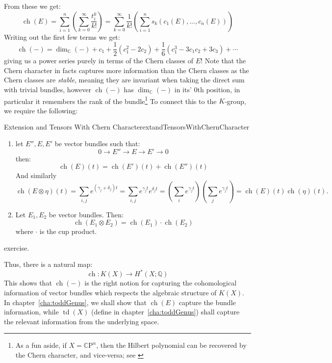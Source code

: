 \documentclass{book}
\newcommand{\C}{{\mathbb{C}}}
\newcommand{\Q}{{\mathbb{Q}}}
\newcommand{\CP}{\mathbb{C}\mathrm{P}}
\newcommand{\ch}{{\operatorname{ch}}}
\newcommand{\td}{{\operatorname{td}}}
\begin{document}
From these we get:
\[
\ch(E) = \sum_{i=1}^n \left(\sum_{k=0}^{\infty} \frac{t_i^k}{k!}\right) = \sum_{k=0}^{\infty}
\frac{1}{k!}\left(\sum_{i=1}^n s_k(c_1(E), ..., c_n(E))\right)
\]
Writing out the first few terms we get:
\[
  \ch(-) = \dim_\C(-) + c_1 + \frac{1}{2}(c_1^2 - 2c_2) + \frac{1}{6}(c_1^3 - 3c_1c_2 + 3c_3) + \cdots
\]
giving us a power series purely in terms of the Chern classes of $E$! Note that the Chern character in facts
captures more information than the Chern classes as the Chern classes are \emph{stable}, meaning they are
invariant when taking the direct sum with trivial bundles, however $\ch(-)$ has $\dim_\C(-)$ in its' $0$th
position, in particular it remembers the rank of the bundle\footnote{As a fun aside, if $X = \CP^n$, then the
Hilbert polynomial can be recovered by the Chern character, and vice-versa; see \cite{chanCorresondenceHilbertPolynomial2004}} To connect this to the $K$-group, we
require the following:

\begin{prop}{Extension and Tensors With Chern Character}{extandTensorsWithChernCharacter}
  \begin{enumerate}
    \item let $E'', E, E'$ be vector bundles such that:
  \[
    0 \to E'' \to E \to E' \to 0
  \]
  then:
  \[
    \ch(E)(t) = \ch(E')(t) + \ch(E'')(t)
  \]
  And similarly
  \[
      \operatorname{ch}(E \otimes \eta)(t) = \sum_{i,j} e^{(\gamma_j+\delta_j)t} = \sum_{i,j} e^{\gamma_j t}e^{\delta_j t} = \left(\sum_i e^{\gamma_j t}\right)\left(\sum_j e^{\gamma_j t}\right) = \operatorname{ch}(E)(t)\operatorname{ch}(\eta)(t).
  \]
    \item Let $E_1, E_2$ be vector bundles. Then:
      \[
        \ch(E_1\otimes E_2) = \ch(E_1)\cdot \ch(E_2)
    \]
    where $\cdot$ is the cup product.
  \end{enumerate}
\end{prop}

\begin{Proof}
  exercise.
\end{Proof}

 Thus, there is a natural map:
\[
  \ch: K(X) \to H^*(X; \Q)
\]
This shows that $\ch(-)$ is the right notion for capturing the cohomological information of vector bundles which
respects the algebraic structure of $K(X)$. In chapter~\ref{cha:toddGenus}, we shall show that $\ch(E)$
capture the bundle information, while $\td(X)$ (define in chapter~\ref{cha:toddGenus}) shall capture the
relevant information from the underlying space.
\end{document}
